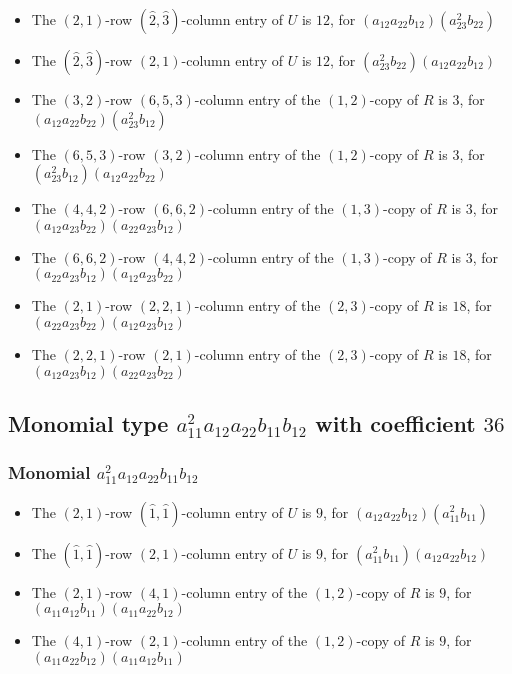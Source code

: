 \documentclass{article}
\begin{document}
\begin{itemize}
\item The $ \left(2, 1\right) $-row $ (\hat{2}, \hat{3}) $-column entry of $U$ is $ 12 $, for $( a_{12} a_{22} b_{12} )( a_{23}^{2} b_{22} )$ 
\item The $(\hat{2}, \hat{3})$-row $ \left(2, 1\right) $-column entry of $U$ is $ 12 $, for $( a_{23}^{2} b_{22} )( a_{12} a_{22} b_{12} )$ 
\item The $(3, 2)$-row $(6, 5, 3)$-column entry of the $ \left(1, 2\right) $-copy of $R$ is $ 3 $, for $( a_{12} a_{22} b_{22} )( a_{23}^{2} b_{12} )$ 
\item The $(6, 5, 3)$-row $(3, 2)$-column entry of the $ \left(1, 2\right) $-copy of $R$ is $ 3 $, for $( a_{23}^{2} b_{12} )( a_{12} a_{22} b_{22} )$ 
\item The $(4, 4, 2)$-row $(6, 6, 2)$-column entry of the $ \left(1, 3\right) $-copy of $R$ is $ 3 $, for $( a_{12} a_{23} b_{22} )( a_{22} a_{23} b_{12} )$ 
\item The $(6, 6, 2)$-row $(4, 4, 2)$-column entry of the $ \left(1, 3\right) $-copy of $R$ is $ 3 $, for $( a_{22} a_{23} b_{12} )( a_{12} a_{23} b_{22} )$ 
\item The $(2, 1)$-row $(2, 2, 1)$-column entry of the $ \left(2, 3\right) $-copy of $R$ is $ 18 $, for $( a_{22} a_{23} b_{22} )( a_{12} a_{23} b_{12} )$ 
\item The $(2, 2, 1)$-row $(2, 1)$-column entry of the $ \left(2, 3\right) $-copy of $R$ is $ 18 $, for $( a_{12} a_{23} b_{12} )( a_{22} a_{23} b_{22} )$ 
\end{itemize}
\subsection{Monomial type $ a_{11}^{2} a_{12} a_{22} b_{11} b_{12} $ with coefficient $ 36 $}

\subsubsection{Monomial $ a_{11}^{2} a_{12} a_{22} b_{11} b_{12} $}

\begin{itemize}
\item The $ \left(2, 1\right) $-row $ (\hat{1}, \hat{1}) $-column entry of $U$ is $ 9 $, for $( a_{12} a_{22} b_{12} )( a_{11}^{2} b_{11} )$ 
\item The $(\hat{1}, \hat{1})$-row $ \left(2, 1\right) $-column entry of $U$ is $ 9 $, for $( a_{11}^{2} b_{11} )( a_{12} a_{22} b_{12} )$ 
\item The $(2, 1)$-row $(4, 1)$-column entry of the $ \left(1, 2\right) $-copy of $R$ is $ 9 $, for $( a_{11} a_{12} b_{11} )( a_{11} a_{22} b_{12} )$ 
\item The $(4, 1)$-row $(2, 1)$-column entry of the $ \left(1, 2\right) $-copy of $R$ is $ 9 $, for $( a_{11} a_{22} b_{12} )( a_{11} a_{12} b_{11} )$ 
\end{itemize}
\end{document}
